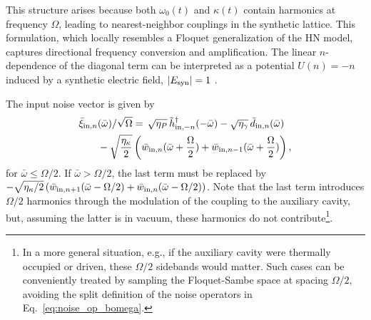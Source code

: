 \documentclass[a4paper,twocolumn,floatfix,10pt,superscriptaddress]%
{quantumarticle}
\newcommand{\mcrc}[1]{{\color{mcrcolor}{[MCR: #1]}}}
\newcommand{\ket}[1]{\ensuremath{\left|{#1}\right\rangle}}
\newcommand{\bra}[1]{\ensuremath{\left\langle{#1}\right|}}
\newcommand{\bomega}{{\bar{\omega}}}
\newcommand{\rmin}{{{\rm in}}}
\begin{document}
This structure arises because both $\omega_0(t)$ and $\kappa(t)$ contain harmonics at frequency $\Omega$, leading to nearest-neighbor couplings in the synthetic lattice. This formulation, which locally resembles a Floquet generalization of the HN model, captures directional frequency conversion and amplification. The linear $n$-dependence of the diagonal term can be interpreted as a potential $U(n)=-n$ induced by a synthetic electric field, $|E_{\rm syn}| = 1$ \cite{GomezLeon2013,Martin2017}.


The input noise vector \mcrc{in frequency space} is given by
\begin{align}\label{eq:noise_op_bomega}
\begin{aligned}
\bar{\xi}_{\rmin,n}&(\bomega)/\sqrt{\Omega}
= \,\sqrt{\eta_P}\, \tilde{h}^\dagger_{\rmin,-n}(-\bomega)- 
\sqrt{\eta_{\gamma}}\, \bar{d}_{\rmin,n}(\bomega)\\
&- \sqrt{\frac{\eta_\kappa}{2}} \left( \bar{w}_{\rmin,n}(\bomega + \frac{\Omega}{2}) + \bar{w}_{\rmin,n-1}(\bomega + \frac{\Omega}{2}) \right),
\end{aligned} 
\end{align}
for $\bomega \leq \Omega/2$. If 
$\bomega > \Omega/2$, the last term must be replaced by $-\sqrt{\eta_\kappa/2}
\left( \bar{w}_{\rmin,n+1}(\bomega - \Omega/2) + \bar{w}_{\rmin,n}(\bomega - \Omega/2) \right)$. Note that the last term introduces $\Omega/2$ harmonics through the modulation of the coupling to the auxiliary cavity, but, assuming the latter is in vacuum, these harmonics do not contribute\footnote{In a more general situation, e.g., if the auxiliary cavity were thermally occupied or driven, these $\Omega/2$ sidebands would matter. Such cases can be conveniently treated by sampling the Floquet-Sambe space at spacing $\Omega/2$, avoiding the split definition of the noise operators in Eq.~\eqref{eq:noise_op_bomega}.}. 
\end{document}
